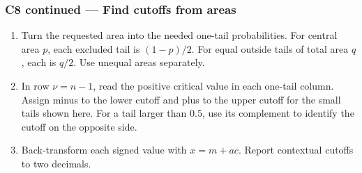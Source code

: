 \clearpage
\subsubsection*{C8 continued --- Find cutoffs from areas}
\begin{enumerate}
  \item Turn the requested area into the needed one-tail probabilities. For central area \(p\), each excluded tail is \((1-p)/2\). For equal outside tails of total area \(q\), each is \(q/2\). Use unequal areas separately.
  \item In row \(\nu=n-1\), read the positive critical value in each one-tail column. Assign minus to the lower cutoff and plus to the upper cutoff for the small tails shown here. For a tail larger than \(0.5\), use its complement to identify the cutoff on the opposite side.
  \item Back-transform each signed value with \(x=m+ac\). Report contextual cutoffs to two decimals. 
\end{enumerate}

